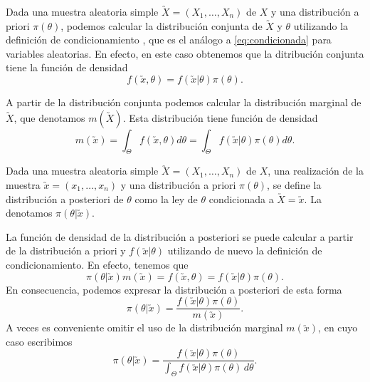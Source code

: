 \begin{remark}
	Dada una muestra aleatoria simple $\utilde{X} = (X_1,\ldots,X_n)$ de $X$ y una distribución a priori $\pi(\theta)$, podemos calcular la distribución conjunta de $\utilde{X}$ y $\theta$ utilizando la definición de condicionamiento \cite{loeve}, que es el análogo a \eqref{eq:condicionada} para variables aleatorias. En efecto, en este caso obtenemos que la ditribución conjunta tiene la función de densidad
    \[f(\utilde{x},\theta)=f(\utilde{x}|\theta)\pi(\theta).\]

    A partir de la distribución conjunta podemos calcular la distribución marginal de $\utilde{X}$, que denotamos $m(\utilde{X})$. Esta distribución tiene función de densidad
	\[m(\utilde{x}) = \int_{\Theta}{f(\utilde{x},\theta)d\theta} = \int_{\Theta}{f(\utilde{x}|\theta)\pi(\theta)d\theta}.\]
\end{remark}

\begin{definition}

	Dada una muestra aleatoria simple $\utilde{X} = (X_1,\ldots,X_n)$ de $X$, una realización de la muestra $\utilde{x}=(x_1,\ldots,x_n)$ y una distribución a priori $\pi(\theta)$, se define la distribución a posteriori de $\theta$ como la ley de $\theta$ condicionada a $\utilde{X} = \utilde{x}$. La denotamos $\pi(\theta | \utilde{x})$.
\end{definition}

La función de densidad de la distribución a posteriori se puede calcular a partir de la distribución a priori y $f(\utilde{x}|\theta)$ utilizando de nuevo la definición de condicionamiento. En efecto, tenemos que
\[\pi(\theta|\utilde{x}) m(\utilde{x}) = f(\utilde{x}, \theta) = f(\utilde{x}|\theta)\pi(\theta).\]
En consecuencia, podemos expresar la distribución a posteriori de esta forma
\[\pi(\theta|\utilde{x}) = \frac{f(\utilde{x}|\theta)\pi(\theta)}{m(\utilde{x})}.\]
A veces es conveniente omitir el uso de la distribución marginal $m(\utilde{x})$, en cuyo caso escribimos
\[\pi(\theta|\utilde{x})= \frac{f(\utilde{x}|\theta)\pi(\theta)}{\int_{\Theta}{f(\utilde{x}|\theta)\pi(\theta)\,d\theta}}.\]


